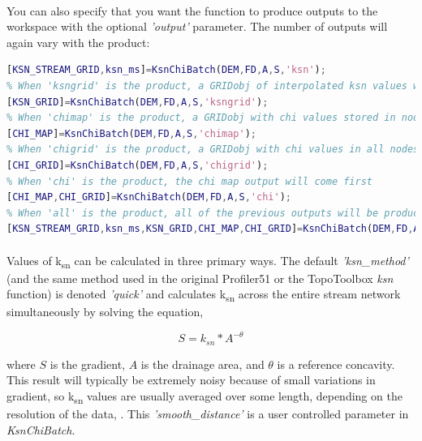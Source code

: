 \paragraph{}You can also specify that you want the function to produce outputs to the workspace with the optional \textit{'output'} parameter. The number of outputs will again vary with the product:

\begin{lstlisting}[language=Matlab]
% When 'ksn' is the 'product', two outputs will be produced, a GRIDobj with averaged ksn values stored in nodes along the stream network  (KSN_STREAM_GRID) and a geographic information structure of ksn values (ksn_ms)
[KSN_STREAM_GRID,ksn_ms]=KsnChiBatch(DEM,FD,A,S,'ksn');
% When 'ksngrid' is the product, a GRIDobj of interpolated ksn values will be produced
[KSN_GRID]=KsnChiBatch(DEM,FD,A,S,'ksngrid');
% When 'chimap' is the product, a GRIDobj with chi values stored in nodes along the stream network will be produced
[CHI_MAP]=KsnChiBatch(DEM,FD,A,S,'chimap');
% When 'chigrid' is the product, a GRIDobj with chi values in all nodes not excluded by outlet conditions will be produced
[CHI_GRID]=KsnChiBatch(DEM,FD,A,S,'chigrid');
% When 'chi' is the product, the chi map output will come first
[CHI_MAP,CHI_GRID]=KsnChiBatch(DEM,FD,A,S,'chi');
% When 'all' is the product, all of the previous outputs will be produced in the following order
[KSN_STREAM_GRID,ksn_ms,KSN_GRID,CHI_MAP,CHI_GRID]=KsnChiBatch(DEM,FD,A,S,'all');
\end{lstlisting}

\paragraph{}Values of k\textsubscript{sn} can be calculated in three primary ways. The default \textit{'ksn\_method'} (and the same method used in the original Profiler51 or the TopoToolbox \textit{ksn} function) is denoted \textit{'quick'} and calculates k\textsubscript{sn} across the entire stream network simultaneously by solving the equation, 

\begin{equation}
 S=k_{sn}*A^{-\theta}
\end{equation}

\noindent where $S$ is the gradient, $A$ is the drainage area, and $\theta$ is a reference concavity. This result will typically be extremely noisy because of small variations in gradient, so k\textsubscript{sn} values are usually averaged over some length, depending on the resolution of the data, \citep[e.g.,][]{Wobus2006}. This \textit{'smooth\_distance'} is a user controlled parameter in \textit{KsnChiBatch}. 

